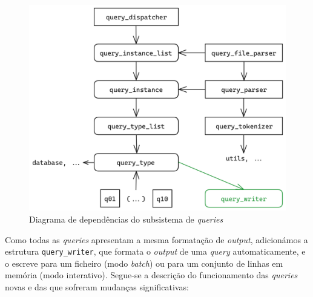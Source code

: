 \documentclass[11pt, a4paper]{article}
\begin{document}
\begin{figure}[ht]
    \centering
    \includegraphics[scale=0.15]{res-fase2/queries.png}
    \caption{Diagrama de dependências do subsistema de \emph{queries}}
    \label{fig:queries}
\end{figure}

Como todas as \emph{queries} apresentam a mesma formatação de \emph{output}, adicionámos a estrutura
\texttt{query\_writer}, que formata o \emph{output} de uma \emph{query} automaticamente, e o
escreve para um ficheiro (modo \emph{batch}) ou para um conjunto de linhas em memória (modo
interativo). Segue-se a descrição do funcionamento das \emph{queries} novas e das que sofreram
mudanças significativas:
\end{document}
